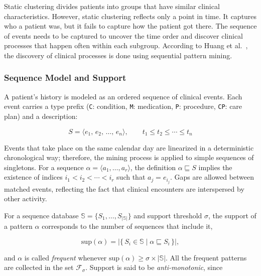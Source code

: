 Static clustering divides patients into groups that have similar clinical characteristics. However, static clustering reflects only a point in time. It captures who a patient was, but it fails to capture how the patient got there. The sequence of events needs to be captured to uncover the time order and discover clinical processes that happen often within each subgroup. According to Huang et al.~\cite{huang2014}, the discovery of clinical processes is done using sequential pattern mining.

\subsubsection*{Sequence Model and Support}

A patient's history is modeled as an ordered sequence of clinical events. Each event carries a type prefix (\texttt{C}: condition, \texttt{M}: medication, \texttt{P}: procedure, \texttt{CP}: care plan) and a description:

\begin{equation}
    S = \langle e_1,\, e_2,\, \ldots,\, e_n \rangle, \qquad t_1 \leq t_2 \leq \cdots \leq t_n
    \label{eq:sequence}
\end{equation}

Events that take place on the same calendar day are linearized in a deterministic chronological way; therefore, the mining process is applied to simple sequences of singletons. For a sequence $\alpha = \langle a_1, \ldots, a_r \rangle$, the definition $\alpha \sqsubseteq S$ implies the existence of indices $i_1 < i_2 < \cdots < i_r$ such that $a_j = e_{i_j}$. Gaps are allowed between matched events, reflecting the fact that clinical encounters are interspersed by other activity.

For a sequence database $\mathbb{S} = \{S_1, \ldots, S_{|\mathbb{S}|}\}$ and support threshold $\sigma$, the support of a pattern $\alpha$ corresponds to the number of sequences that include it,

\begin{equation}
    \mathrm{sup}(\alpha) = \bigl|\{\, S_i \in \mathbb{S} \mid \alpha \sqsubseteq S_i \,\}\bigr|,
    \label{eq:support}
\end{equation}

and $\alpha$ is called \emph{frequent} whenever $\mathrm{sup}(\alpha) \geq \sigma \times |\mathbb{S}|$. All the frequent patterns are collected in the set $\mathcal{F}_\sigma$. Support is said to be \emph{anti-monotonic}, since

